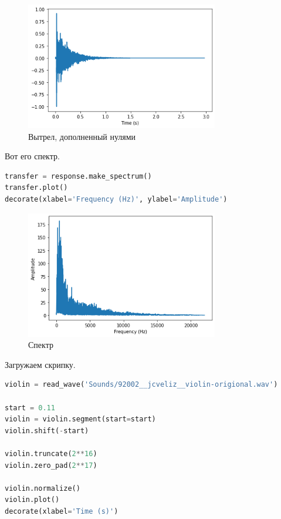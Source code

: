 \documentclass[a4paper,12pt]{report}
\begin{document}
    \begin{figure}[H]
        \centering
        \includegraphics[width=0.75\textwidth]{images/ex1_shot_1.png}
        \caption{Вытрел, дополненный нулями}
        \label{fig:ex1_shot_1}
    \end{figure}
    
    Вот его спектр.
    
\begin{lstlisting}[language=Python,caption=Спектр выстрела]
transfer = response.make_spectrum()
transfer.plot()
decorate(xlabel='Frequency (Hz)', ylabel='Amplitude')
\end{lstlisting}

    \begin{figure}[H]
        \centering
        \includegraphics[width=0.75\textwidth]{images/ex1_shot_2.png}
        \caption{Спектр}
        \label{fig:ex1_shot_2}
    \end{figure}
    
    Загружаем скрипку.
    
\begin{lstlisting}[language=Python,caption=Сигнал скрипки]
violin = read_wave('Sounds/92002__jcveliz__violin-origional.wav')

start = 0.11
violin = violin.segment(start=start)
violin.shift(-start)

violin.truncate(2**16)
violin.zero_pad(2**17)

violin.normalize()
violin.plot()
decorate(xlabel='Time (s)')
\end{lstlisting}
\end{document}
